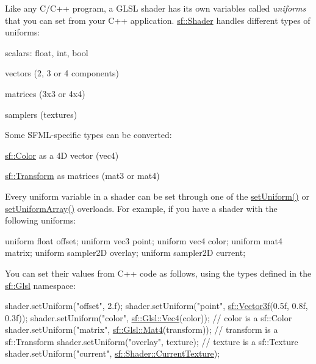 Like any C/\+C++ program, a G\+L\+SL shader has its own variables called {\itshape uniforms} that you can set from your C++ application. \hyperlink{classsf_1_1_shader}{sf\+::\+Shader} handles different types of uniforms\+: \begin{DoxyItemize}
\item scalars\+: {\ttfamily float}, {\ttfamily int}, {\ttfamily bool} \item vectors (2, 3 or 4 components) \item matrices (3x3 or 4x4) \item samplers (textures)\end{DoxyItemize}
Some S\+F\+M\+L-\/specific types can be converted\+: \begin{DoxyItemize}
\item \hyperlink{classsf_1_1_color}{sf\+::\+Color} as a 4D vector ({\ttfamily vec4}) \item \hyperlink{classsf_1_1_transform}{sf\+::\+Transform} as matrices ({\ttfamily mat3} or {\ttfamily mat4})\end{DoxyItemize}
Every uniform variable in a shader can be set through one of the \hyperlink{classsf_1_1_shader_abf78e3bea1e9b0bab850b6b0a0de29c7}{set\+Uniform()} or \hyperlink{classsf_1_1_shader_a731d3b9953c50fe7d3fb03340b97deff}{set\+Uniform\+Array()} overloads. For example, if you have a shader with the following uniforms\+: 
\begin{DoxyCode}
uniform \textcolor{keywordtype}{float} offset;
uniform vec3 point;
uniform vec4 color;
uniform mat4 matrix;
uniform sampler2D overlay;
uniform sampler2D current;
\end{DoxyCode}
 You can set their values from C++ code as follows, using the types defined in the \hyperlink{namespacesf_1_1_glsl}{sf\+::\+Glsl} namespace\+: 
\begin{DoxyCode}
shader.setUniform(\textcolor{stringliteral}{"offset"}, 2.f);
shader.setUniform(\textcolor{stringliteral}{"point"}, \hyperlink{classsf_1_1_vector3}{sf::Vector3f}(0.5f, 0.8f, 0.3f));
shader.setUniform(\textcolor{stringliteral}{"color"}, \hyperlink{structsf_1_1priv_1_1_vector4}{sf::Glsl::Vec4}(color));          \textcolor{comment}{// color is a sf::Color}
shader.setUniform(\textcolor{stringliteral}{"matrix"}, \hyperlink{structsf_1_1priv_1_1_matrix}{sf::Glsl::Mat4}(transform));     \textcolor{comment}{// transform is a sf::Transform}
shader.setUniform(\textcolor{stringliteral}{"overlay"}, texture);                      \textcolor{comment}{// texture is a sf::Texture}
shader.setUniform(\textcolor{stringliteral}{"current"}, \hyperlink{classsf_1_1_shader_ac84c7953eec2e19358ea6e2cc5385b8d}{sf::Shader::CurrentTexture});
\end{DoxyCode}


